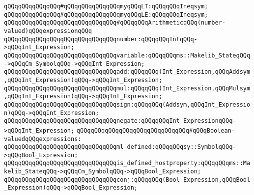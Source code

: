 \verb|qQQqqQQqqQQqqQQq#qQQqqQQqqQQqqQQqmyqQQqLT:qQQqqQQqIneqsym;|\newline
\verb|qQQqqQQqqQQqqQQq#qQQqqQQqqQQqqQQqmyqQQqLE:qQQqqQQqIneqsym;|\newline
\newline
\newline
\newline
\verb|qQQqqQQqqQQqqQQqqQQqqQQqqQQqqQQq#qQQqqQQqArithmeticqQQq(number-valued)qQQqexpressionqQQq|\newline
\newline
\verb|qQQqqQQqqQQqqQQqqQQqqQQqqQQqqQQqnumber:qQQqqQQqIntqQQq->qQQqInt_Expression;|\newline
\newline
\verb|qQQqqQQqqQQqqQQqqQQqqQQqqQQqqQQqvariable:qQQqqQQqms::Makelib_StateqQQq->qQQqCm_SymbolqQQq->qQQqInt_Expression;|\newline
\newline
\verb|qQQqqQQqqQQqqQQqqQQqqQQqqQQqqQQqadd:qQQqqQQq(Int_Expression,qQQqAddsym,qQQqInt_Expression)qQQq->qQQqInt_Expression;|\newline
\verb|qQQqqQQqqQQqqQQqqQQqqQQqqQQqqQQqmul:qQQqqQQq(Int_Expression,qQQqMulsym,qQQqInt_Expression)qQQq->qQQqInt_Expression;|\newline
\newline
\verb|qQQqqQQqqQQqqQQqqQQqqQQqqQQqqQQqsign:qQQqqQQq(Addsym,qQQqInt_Expression)qQQq->qQQqInt_Expression;|\newline
\newline
\verb|qQQqqQQqqQQqqQQqqQQqqQQqqQQqqQQqnegate:qQQqqQQqInt_ExpressionqQQq->qQQqInt_Expression;|\newline
\newline
\newline
\newline
\verb|qQQqqQQqqQQqqQQqqQQqqQQqqQQqqQQq#qQQqBoolean-valuedqQQqexpressions:|\newline
\newline
\verb|qQQqqQQqqQQqqQQqqQQqqQQqqQQqqQQqml_defined:qQQqqQQqsy::SymbolqQQq->qQQqBool_Expression;|\newline
\newline
\verb|qQQqqQQqqQQqqQQqqQQqqQQqqQQqqQQqis_defined_hostproperty:qQQqqQQqms::Makelib_StateqQQq->qQQqCm_SymbolqQQq->qQQqBool_Expression;|\newline
\newline
\verb|qQQqqQQqqQQqqQQqqQQqqQQqqQQqqQQqconj:qQQqqQQq(Bool_Expression,qQQqBool_Expression)qQQq->qQQqBool_Expression;|\newline
